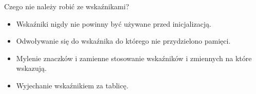 \documentclass[notheorems, aspectratio=54]{beamer}
\begin{document}
\begin{frame}
	Czego nie należy robić ze wskaźnikami?\\
	\begin{itemize}
		\item Wskaźniki nigdy nie powinny być używane przed inicjalizacją.\\
		\item Odwoływanie się do wskaźnika do którego nie przydzielono pamięci.\\
		\item Mylenie znaczków i zamienne stosowanie wskaźników i zmiennych na które wskazują.\\
		\item Wyjechanie wskaźnikiem za tablicę.
	\end{itemize}
	
	
\end{frame}
\end{document}

